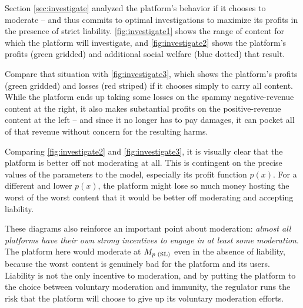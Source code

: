 Section \ref{sec:investigate} analyzed the platform's behavior if it chooses to moderate -- and thus commits to optimal investigations to maximize its profits in the presence of strict liability.  \autoref{fig:investigate1} shows the range of content for which the platform will investigate, and \autoref{fig:investigate2} shows the platform's profits (green gridded) and additional social welfare (blue dotted) that result.

Compare that situation with \autoref{fig:investigate3}, which shows the platform's profits (green gridded) and losses (red striped) if it chooses simply to carry all content. While the platform ends up taking some losses on the spammy negative-revenue content at the right, it also makes substantial profits on the positive-revenue content at the left -- and since it no longer has to pay damages, it can pocket all of that revenue without concern for the resulting harms.

Comparing \autoref{fig:investigate2} and \autoref{fig:investigate3}, it is visually clear that the platform is better off not moderating at all. This is contingent on the precise values of the parameters to the model, especially its profit function $p(x)$. For a different and lower $p(x)$, the platform might lose so much money hosting the worst of the worst content that it would be better off moderating and accepting liability.

These diagrams also reinforce an important point about moderation: \emph{almost all platforms have their own strong incentives to engage in at least some moderation}. The platform here would moderate at $M_{p \text{ (SL)}}$ even in the absence of liability, because the worst content is genuinely bad for the platform and its users. Liability is not the only incentive to moderation, and by putting the platform to the choice between voluntary moderation and immunity, the regulator runs the risk that the platform will choose to give up its voluntary moderation efforts.


